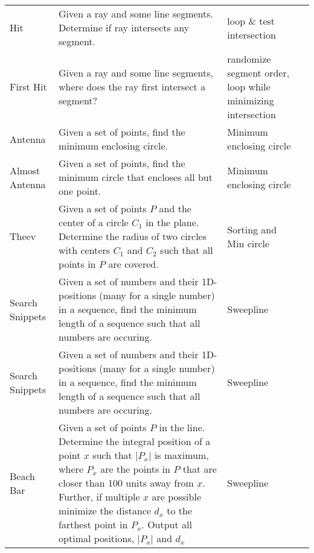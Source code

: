 \documentclass[a4paper, 10pt]{article}
\begin{document}
\begin{longtable}{ L{2cm} L{8cm} L{4cm} r}
        Hit 
        & Given a ray and some line segments. Determine if ray intersects any segment. 
        & loop \& test intersection &  \pageref{sec:hit} \\

        First Hit 
        & Given a ray and some line segments, where does the ray first intersect a segment? 
        & randomize segment order, loop while minimizing intersection &  \pageref{sec:first_hit} \\

        Antenna 
        & Given a set of points, find the minimum enclosing circle. 
        & Minimum enclosing circle &  \pageref{sec:antenna} \\

        Almost Antenna
        & Given a set of points, find the minimum circle that encloses all but one point.
        & Minimum enclosing circle &  \pageref{sec:almost_antenna} \\

        Theev 
        & Given a set of points $P$ and the center of a circle $C_1$ in the plane. Determine the radius of two circles
            with centers $C_1$ and $C_2$ such that all points in $P$ are covered.
        & Sorting and Min circle &  \pageref{sec:theev} \\

        Search Snippets 
        & Given a set of numbers and their 1D-positions (many for a single number) in a sequence, find the minimum length 
            of a sequence such that all numbers are occuring.       
        & Sweepline &  \pageref{sec:search_snippets} \\

        Search Snippets 
        & Given a set of numbers and their 1D-positions (many for a single number) in a sequence, find the minimum length 
            of a sequence such that all numbers are occuring.       
        & Sweepline &  \pageref{sec:search_snippets} \\

        Beach Bar 
        & Given a set of points $P$ in the line. 
            Determine the integral position of a point $x$ such that $|P_x|$ is maximum, 
            where $P_x$ are the points in $P$ that are closer than 100 units away from $x$.
            Further, if multiple $x$ are possible minimize the distance $d_x$ to the farthest point in $P_x$. 
            Output all optimal positions, $|P_x|$ and $d_x$  
        & Sweepline &  \pageref{sec:beach_bar} \\


\end{longtable}
\end{document}
